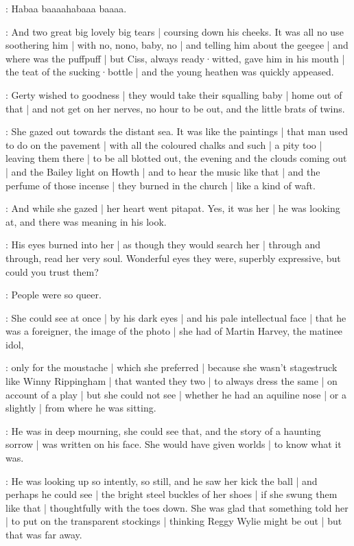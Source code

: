 \baby:
Habaa baaaahabaaa baaaa.

:
And two great big lovely big tears |
coursing down his cheeks.
It was all no use
soothering him |
with no, nono, baby, no |%
and telling him about the geegee |
and where was the puffpuff |
but Ciss,
always ready·witted,
gave him in his mouth |
the teat of the sucking·bottle |
and the young heathen was quickly appeased.

\gertyJudgy:
Gerty wished to goodness |
they would take their squalling baby |
home out of that |
and not get on her nerves,
no hour to be out,
and the little brats of twins.

\gertyReal:
She gazed out towards the distant sea.
It was like the paintings |
that man used to do on the pavement |
with all the coloured chalks and such |
a pity too |
leaving them there |
to be all blotted out,
the evening and the clouds coming out |
and the Bailey light on Howth |
and to hear the music like that |
and the perfume of those incense |
they burned in the church |%
like a kind of waft.

\gertySex:
And while she gazed |
her heart went pitapat.
Yes,
it was her |
he was looking at,
and there was meaning in his look.

\gertyNovel:
His eyes burned into her |
as though they would search her |
through and through,
read her very soul.
Wonderful eyes they were,
superbly expressive,
but could you trust them?

\gertyReal:
People were so queer.

\gertyNovel:
She could see at once |
by his dark eyes |
and his pale intellectual face |
that he was a foreigner,
the image of the photo |
she had of Martin Harvey,
the matinee idol,

\gertyReal:
only for the moustache |
which she preferred |
because she wasn't stagestruck like Winny Rippingham |
that wanted they two |
to always dress the same |
on account of a play |
but she could not see |%
whether he had an aquiline nose |
or a slightly  |
from where he was sitting.

\gertyNovel:
He was in deep mourning,
she could see that,
and the story of a haunting sorrow |
was written on his face.
She would have given worlds |
to know what it was.

\gertySex:
He was looking up so intently,
so still,
and he saw her kick the ball |
and perhaps he could see |
the bright steel buckles of her shoes |
if she swung them like that |
thoughtfully with the toes down.
She was glad that something told her |
to put on the transparent stockings |
thinking Reggy Wylie might be out |
but that was far away.

